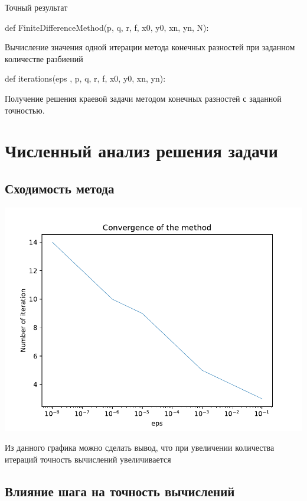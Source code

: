 Точный результат

def FiniteDifferenceMethod(p, q, r, f, x0, y0, xn, yn, N):

Вычисление значения одной итерации метода конечных разностей при заданном количестве разбиений

def iterations(eps , p, q, r, f, x0, y0, xn, yn):

Получение решения краевой задачи методом конечных разностей с заданной точностью.

\section{Численный анализ решения задачи}

\subsection{Сходимость метода}

\includegraphics[scale=0.75]{1.pdf}

Из данного графика можно сделать вывод, что при увеличении количества итераций точность вычислений увеличивается

\subsection{Влияние шага на точность вычислений}

